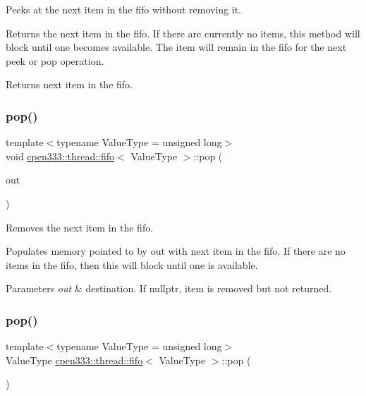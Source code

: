 Peeks at the next item in the fifo without removing it. 

Returns the next item in the fifo. If there are currently no items, this method will block until one becomes available. The item will remain in the fifo for the next {\ttfamily peek} or {\ttfamily pop} operation.

\begin{DoxyReturn}{Returns}
next item in the fifo. 
\end{DoxyReturn}
\mbox{\label{classcpen333_1_1thread_1_1fifo_a501e527a9036433e38aac51b5e0726ae}} 
\subsubsection{\texorpdfstring{pop()}{pop()}\hspace{0.1cm}{\footnotesize\ttfamily [1/2]}}
{\footnotesize\ttfamily template$<$typename Value\+Type  = unsigned long$>$ \\
void \hyperlink{classcpen333_1_1thread_1_1fifo}{cpen333\+::thread\+::fifo}$<$ Value\+Type $>$\+::pop (\begin{DoxyParamCaption}\item[{Value\+Type $\ast$}]{out }\end{DoxyParamCaption})\hspace{0.3cm}{\ttfamily [inline]}}



Removes the next item in the fifo. 

Populates memory pointed to by {\ttfamily out} with next item in the fifo. If there are no items in the fifo, then this will block until one is available.


\begin{DoxyParams}{Parameters}
{\em out} & destination. If {\ttfamily nullptr}, item is removed but not returned. \\
\hline
\end{DoxyParams}
\mbox{\label{classcpen333_1_1thread_1_1fifo_a87f35e103028525f9c1c65c3767548fd}} 
\subsubsection{\texorpdfstring{pop()}{pop()}\hspace{0.1cm}{\footnotesize\ttfamily [2/2]}}
{\footnotesize\ttfamily template$<$typename Value\+Type  = unsigned long$>$ \\
Value\+Type \hyperlink{classcpen333_1_1thread_1_1fifo}{cpen333\+::thread\+::fifo}$<$ Value\+Type $>$\+::pop (\begin{DoxyParamCaption}{ }\end{DoxyParamCaption})\hspace{0.3cm}{\ttfamily [inline]}}




